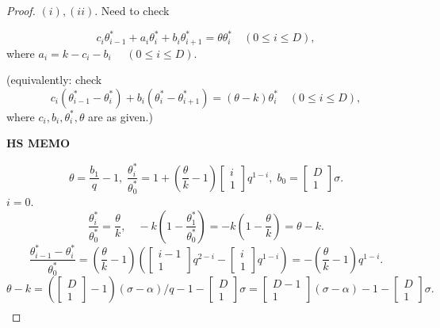 \documentclass[
]{book}
\theoremstyle{definition}
\theoremstyle{definition}
\theoremstyle{definition}
\theoremstyle{definition}
\theoremstyle{remark}
\begin{document}
\begin{proof}
\leavevmode

\((i), (ii)\). Need to check

\[c_i\theta^*_{i-1} + a_i\theta^*_i + b_i\theta^*_{i+1} = \theta \theta^*_i \quad (0\leq i\leq D),\]
where \(a_i = k-c_i - b_i\) \(\quad (0\leq i \leq D)\).

(equivalently: check
\begin{equation}
c_i(\theta^*_{i-1}-\theta^*_i) + b_i(\theta^*_i -\theta^*_{i+1}) = (\theta-k) \theta^*_i \quad (0\leq i\leq D),\label{eq:cibithetak}
\end{equation}
where \(c_i, b_i, \theta^*_i, \theta\) are as given.)

\textbf{HS MEMO}

\[\theta = \frac{b_1}{q}-1, \; \frac{\theta^*_i}{\theta^*_0} = 1 + \left(\frac{\theta}{k}-1\right)\begin{bmatrix}{i}\\{1}\end{bmatrix} q^{1-i}, \; b_0 = \begin{bmatrix}{D}\\{1}\end{bmatrix}\sigma.\]
\(i=0\).
\[\frac{\theta^*_i}{\theta^*_0} = \frac{\theta}{k}, \quad - k\left(1-\frac{\theta^*_1}{\theta^*_0}\right)= -k\left(1-\frac{\theta}{k}\right) = \theta -k.\]
\[\frac{\theta^*_{i-1}-\theta^*_i}{\theta^*_0} = \left(\frac{\theta}{k}-1\right)\left(\begin{bmatrix}{i-1}\\{1}\end{bmatrix}q^{2-i}-\begin{bmatrix}{i}\\{1}\end{bmatrix}q^{1-i}\right)=-\left(\frac{\theta}{k}-1\right)q^{1-i}.\]
\[\theta-k=\left(\begin{bmatrix}{D}\\{1}\end{bmatrix}-1\right)(\sigma-\alpha)/q-1 - \begin{bmatrix}{D}\\{1}\end{bmatrix}\sigma = \begin{bmatrix}{D-1}\\{1}\end{bmatrix}(\sigma-\alpha)-1-\begin{bmatrix}{D}\\{1}\end{bmatrix}\sigma.\]
\begin{align}

\end{align}
\end{proof}
\end{document}
